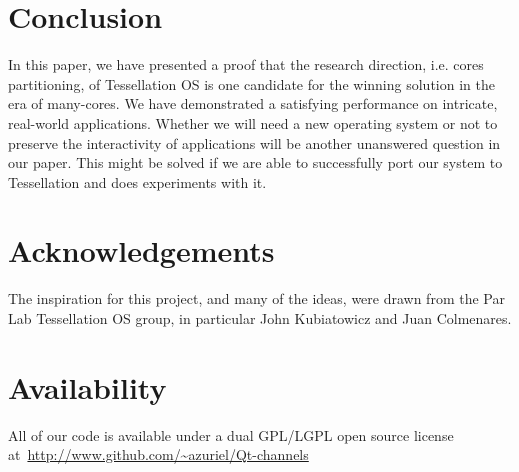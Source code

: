 \documentclass[letterpaper,twocolumn,11pt]{article}
\begin{document}


\section{Conclusion}

In this paper, we have presented a proof that the research direction, i.e. cores partitioning, of Tessellation OS is one candidate for the winning solution in the era of many-cores. We have demonstrated a satisfying performance on intricate, real-world applications. Whether we will need a new operating system or not to preserve the interactivity of applications will be another unanswered question in our paper. This might be solved if we are able to successfully port our system to Tessellation and does experiments with it.

\section{Acknowledgements}

The inspiration for this project, and many of the ideas, were drawn from the Par Lab Tessellation OS group, in particular John Kubiatowicz and Juan Colmenares. 

\section{Availability}

All of our code is available under a dual GPL/LGPL open source license at~\url{http://www.github.com/~azuriel/Qt-channels}

\footnotesize{
}

\end{document}
